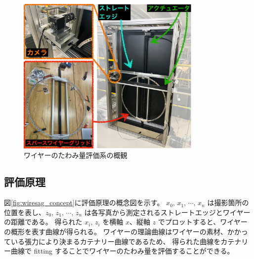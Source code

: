 \documentclass[../../main.tex]{subfiles}
\begin{document}
\begin{figure}[H]
    \centering
    \includegraphics[width=0.8\textwidth]{wiresag/wiresag_system.pdf}
    \caption{ワイヤーのたわみ量評価系の概観}
    \label{fig:wiresag_system}
\end{figure}

\subsection{評価原理}
図\ref{fig:wiresag_concept}に評価原理の概念図を示す。
$x_{0},\,x_{1},\,\cdots,\,x_{n}$ は撮影箇所の位置を表し、$z_{0},\,z_{1},\,\cdots,\,z_{n}$ は各写真から測定されるストレートエッジとワイヤーの距離である。
得られた $x_{i},\,z_{i}$ を横軸 $x$、縦軸 $z$ でプロットすると、ワイヤーの概形を表す曲線が得られる。
ワイヤーの理論曲線はワイヤーの素材、かかっている張力により決まるカテナリー曲線であるため、
得られた曲線をカテナリー曲線で fitting することでワイヤーのたわみ量を評価することができる。
\end{document}
